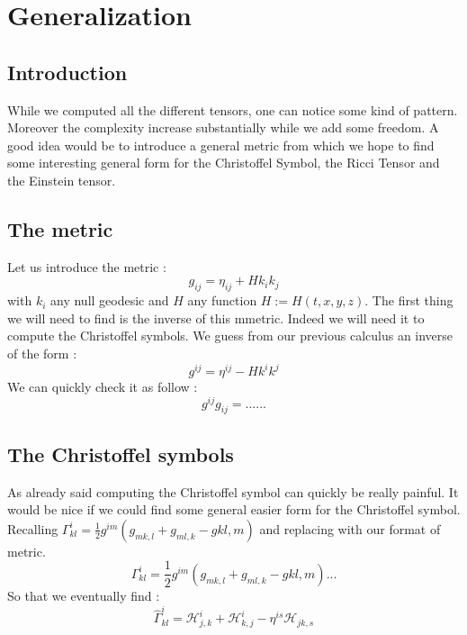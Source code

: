 \documentclass{article}
\begin{document}
\section{Generalization}
    \subsection{Introduction}
        While we computed all the different tensors, one can notice some kind of pattern.
        Moreover the complexity increase substantially while we add some freedom.
        A good idea would be to introduce a general metric from which we hope to find some interesting general form for the Christoffel Symbol, the Ricci Tensor and the Einstein tensor.
    \subsection{The metric}
        Let us introduce the metric :
        \begin{equation}
            g_{ij}=\eta_{ij}+Hk_ik_j
        \end{equation}
        with $k_i$ any null geodesic and $H$ any function $H:=H(t,x,y,z)$.
        The first thing we will need to find is the inverse of this mmetric.
        Indeed we will need it to compute the Christoffel symbols.
        We guess from our previous calculus an inverse of the form :
        \begin{equation}
            g^{ij}=\eta^{ij}-Hk^ik^j
        \end{equation}
        We can quickly check it as follow :
        \begin{equation*}
            g^{ij}g_{ij}= ...
            ...
        \end{equation*}
    \subsection{The Christoffel symbols}
        As already said computing the Christoffel symbol can quickly be really painful.
        It would be nice if we could find some general easier form for the Christoffel symbol.
        Recalling $\Gamma^i_{kl}=\frac{1}{2}g^{im}(g_{mk,l}+g_{ml,k}-g{kl,m})$ and replacing with our format of metric.
        \begin{equation*}
            \Gamma^i_{kl}=\frac{1}{2}g^{im}(g_{mk,l}+g_{ml,k}-g{kl,m})
            ...
        \end{equation*}
        So that we eventually find :
        \begin{equation}
            \hat{\Gamma}^i_{kl}=\mathcal{H}^i_{j,k}+\mathcal{H}^i_{k,j}-\eta^{is}\mathcal{H}_{jk,s}
        \end{equation}
\end{document}
